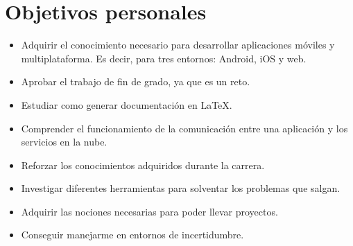 \section{Objetivos personales}
\begin{itemize}
	\item Adquirir el conocimiento necesario para desarrollar aplicaciones móviles y multiplataforma. Es decir, para tres entornos: Android, iOS y web.
	\item Aprobar el trabajo de fin de grado, ya que es un reto.
	\item Estudiar como generar documentación en \LaTeX.
	\item Comprender el funcionamiento de la comunicación entre una aplicación y los servicios en la nube.
	\item Reforzar los conocimientos adquiridos durante la carrera.
	\item Investigar diferentes herramientas para solventar los problemas que salgan.
	\item Adquirir las nociones necesarias para poder llevar proyectos.
	\item Conseguir manejarme en entornos de incertidumbre.
\end{itemize}